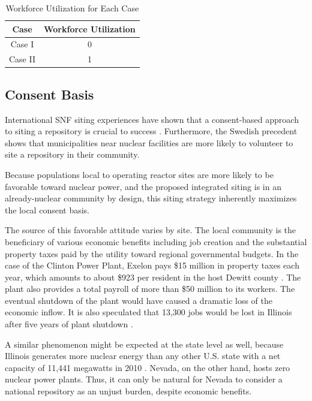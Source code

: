 \begin{table}[h]
	\centering
        \caption {Workforce Utilization for Each Case}
		\begin{tabular}{|c|c|}
			\hline
			Case & Workforce Utilization \\
			\hline
			Case I & 0 \\
			Case II & 1 \\
			\hline
                \end{tabular}
\end{table}


\subsection{Consent Basis}

International \gls{SNF} siting experiences have shown that a consent-based
approach to siting a repository is crucial to success
\cite{ayers_blue_2012,doe_designing_2016,jenkins-smith_public_2013,freeze_siting_2015}. 
Furthermore, the Swedish precedent \cite{olsson_experiences_2013} shows that 
municipalities near nuclear facilities
are more likely to volunteer to site a repository in their community.

Because populations local to operating reactor sites are more likely to be 
favorable toward nuclear power, and the proposed integrated siting 
is in an already-nuclear community by design, this siting strategy inherently 
maximizes the local consent basis.

The source of this favorable attitude varies by site. 
The local community is the beneficiary of various economic benefits
including job creation and the substantial property taxes paid by the utility 
toward regional governmental budgets.   In the case of the Clinton Power Plant, 
Exelon pays \$15 million in property taxes each year, which amounts to about 
\$923 per resident in the host Dewitt county \cite{brady-lunny_dewitt_2016}. The plant
also provides a total payroll of more than \$50 million to its workers.
The eventual shutdown of the plant would have caused a dramatic loss of the economic inflow.
It is also speculated that 13,300 jobs would be lost in Illinois after five years 
of plant shutdown \cite{reid_study:_2014}.  

A similar phenomenon might be expected at the state level as well, because 
Illinois generates more nuclear energy than any other U.S.  state with a net 
capacity of 11,441 megawatts in 2010 \cite{eia_state_2012}. Nevada, on the other 
hand, hosts zero nuclear power plants. Thus, it can only be natural for Nevada 
to consider a national repository as an unjust burden, despite economic 
benefits.  


